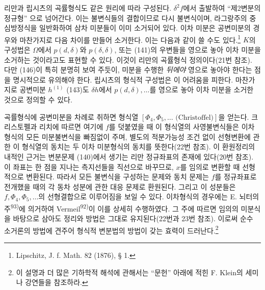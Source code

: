 리만과 립시츠의 곡률형식도 같은 원리에 따라 구성된다. $\delta^2f$에서 출발하여 ``제2변분의 정규형''
으로 넘어간다. 이는 불변식들의 결합이므로 다시 불변식이며, 라그랑주의 중심방정식을 일반화하여 삼차 미분들이 이미 소거되어 있다. 이차 미분은 공변미분의 경우와 마찬가지로 다음 차이를 만들어 소거한다.
이는 다음과 같이 쓸 수도 있다.\footnote{Lipschitz, J. f. Math. 82 (1876), § 1.}
$K$의 구성법은 $\Omega$에서 $p(d,\delta)$와 $p(\delta,\delta)$, 또는 (141)의 우변들을 영으로 놓아 이차 미분을 소거하는 것이라고도 표현할 수 있다. 이것이 리만의 곡률형식 정의이다(21번 참조). 다만 (146)이 특히 분명히 보여 주듯이, 미분을 수행한 \emph{뒤에야} 영으로 놓아야 한다는 점을 명시적으로 유의해야 한다. 립시츠의 형식적 구성법은 이 어려움을 피한다. 마찬가지로 공변미분 $h^{(1)}$ (143)도 $\delta h$에서 $p(d,\delta),\ldots$를 영으로 놓아 이차 미분을 소거한 것으로 정의할 수 있다.

곡률형식에 공변미분을 차례로 취하면 형식열 $[\Phi_4,\Phi_5,\ldots\text{ (Christoffel)}]$을 얻는다. 크리스토펠과 리치에 따르면 여기에 $f$를 덧붙였을 때 이 형식열의 사영불변식들은 이차형식의 모든 미분불변식을 빠짐없이 주며, 별도의 적분가능성 조건 없이 선형변환에 관한 이 형식열의 동치는 두 이차 미분형식의 동치를 뜻한다(22번 참조). 이 환원정리의 내적인 근거는 변분문제 (140)에서 생기는 리만 정규좌표의 존재에 있다(20번 참조). 이 좌표는 한 점을 지나는 측지선들을 직선으로 바꾸므로, $x$를 임의로 변환할 때 선형적으로 변환된다. 따라서 모든 불변식을 구성하는 문제와 동치 문제는 $f$를 정규좌표로 전개했을 때의 각 동차 성분에 관한 대응 문제로 환원된다. 그리고 이 성분들은 $f,\Phi_4,\Phi_5,\ldots$의 선형결합으로 이루어짐을 보일 수 있다. 이차형식의 경우에는 E. 뇌터의 주\textsuperscript{93)}에 의거하여 Vermeil\textsuperscript{92)}이 이를 상세히 수행하였다. 그 주에 따르면 임의의 미분식을 바탕으로 삼아도 정리와 방법은 그대로 유지된다(22번과 23번 참조). 이로써 순수 소거론의 방법에 견주어 형식적 변분법의 방법이 갖는 효력이 드러난다.\footnote{이 설명과 더 많은 기하학적 해석에 관해서는 ``문헌'' 아래에 적힌 F. Klein의 세미나 강연들을 참조하라.}

